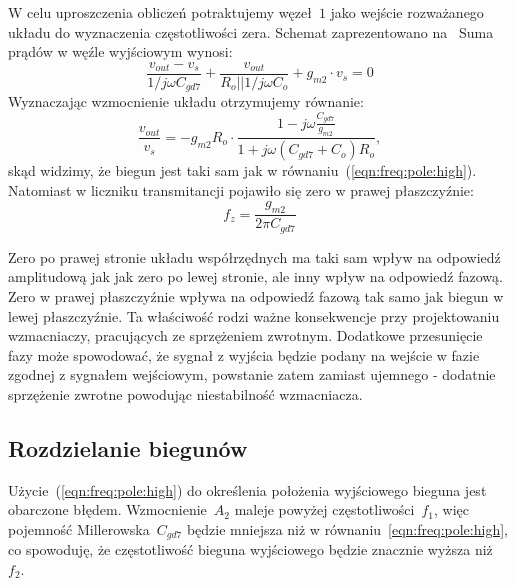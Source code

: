 \documentclass[twoside,pl,final]{labman}
\begin{document}
W celu uproszczenia obliczeń potraktujemy węzeł~$1$
jako wejście rozważanego układu do wyznaczenia częstotliwości zera.
Schemat zaprezentowano na~
Suma prądów w węźle wyjściowym wynosi:
\begin{equation}
  \frac{v_{out} - v_s}{1 / j \omega C_{gd7}} +
  \frac{v_{out}}{R_o || 1 / j \omega C_o} +
  g_{m2} \cdot v_s = 0
\end{equation}
Wyznaczając wzmocnienie układu otrzymujemy równanie:
\begin{equation}
  \frac{v_{out}}{v_{s}} = -g_{m2} R_o \cdot
                          \frac{1 - j \omega \frac{C_{gd7}}{g_{m2}}}
                               {1 + j \omega ( C_{gd7} + C_o ) R_o},
  \label{eqn:freq:rhp:tf}
\end{equation}
skąd widzimy, że biegun jest taki sam jak w
równaniu~(\ref{eqn:freq:pole:high}).
Natomiast w liczniku transmitancji pojawiło się zero w prawej płaszczyźnie:
\begin{equation}
  f_z = \frac{g_{m2}}{2 \pi C_{gd7}}
  \label{eqn:freq:zero}
\end{equation}

Zero po prawej stronie układu współrzędnych
ma taki sam wpływ na odpowiedź amplitudową jak jak zero po lewej stronie,
ale inny wpływ na odpowiedź fazową.
Zero w prawej płaszczyźnie wpływa na odpowiedź fazową
tak samo jak biegun w lewej płaszczyźnie.
Ta właściwość rodzi ważne konsekwencje przy projektowaniu wzmacniaczy,
pracujących ze sprzężeniem zwrotnym.
Dodatkowe przesunięcie fazy może spowodować, że sygnał z wyjścia
będzie podany na wejście w fazie zgodnej z sygnałem wejściowym,
powstanie zatem zamiast ujemnego - dodatnie sprzężenie zwrotne
powodując niestabilność wzmacniacza.

\subsection{Rozdzielanie biegunów}
\label{freq:split}

Użycie~(\ref{eqn:freq:pole:high}) do określenia położenia
wyjściowego bieguna jest obarczone błędem.
Wzmocnienie~$A_2$ maleje powyżej częstotliwości~$f_1$,
więc pojemność Millerowska~$C_{gd7}$ będzie mniejsza
niż w równaniu~\ref{eqn:freq:pole:high},
co spowoduję, że częstotliwość bieguna wyjściowego
będzie znacznie wyższa niż~$f_2$.
\end{document}
